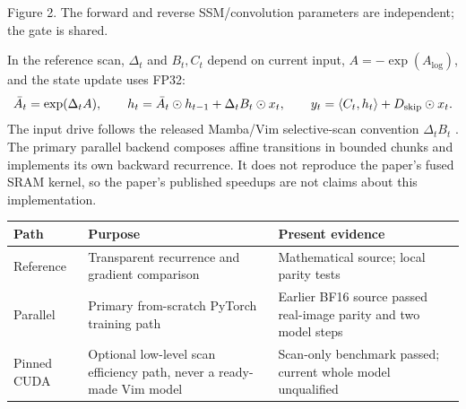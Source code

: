 \documentclass[10pt,a4paper]{article}
\begin{document}
\begin{center}

{\small\color{muted}Figure 2. The forward and reverse SSM/convolution
parameters are independent; the gate is shared.}
\end{center}

In the reference scan, $\Delta_t$ and $B_t,C_t$ depend on current input,
$A=-\exp(A_{\log})$, and the state update uses FP32:
\[
\bar A_t=\exp(\Delta_t A),\qquad
h_t=\bar A_t\odot h_{t-1}+\Delta_t B_t\odot x_t,\qquad
y_t=\langle C_t,h_t\rangle+D_{\rm skip}\odot x_t.
\]
The input drive follows the released Mamba/Vim selective-scan convention
$\Delta_t B_t$ \cite{mamba}. The primary parallel backend composes affine
transitions in bounded chunks and implements its own backward recurrence.
It does not reproduce the paper's fused SRAM kernel, so the paper's
published speedups are not claims about this implementation.

\small
\begin{tabularx}{\linewidth}{@{}p{.19\linewidth}Y p{.27\linewidth}@{}}
\toprule
Path & Purpose & Present evidence\\
\midrule
Reference & Transparent recurrence and gradient comparison &
Mathematical source; local parity tests\\
Parallel & Primary from-scratch PyTorch training path &
Earlier BF16 source passed real-image parity and two model steps\\
Pinned CUDA & Optional low-level scan efficiency path, never a ready-made Vim
model & Scan-only benchmark passed; current whole model unqualified\\
\bottomrule
\end{tabularx}
\normalsize
\end{document}
